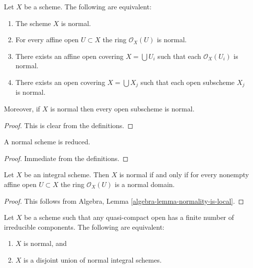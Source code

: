 \begin{lemma}
\label{lemma-locally-normal}
Let $X$ be a scheme. The following are equivalent:
\begin{enumerate}
\item The scheme $X$ is normal.
\item For every affine open $U \subset X$ the ring $\mathcal{O}_X(U)$
is normal.
\item There exists an affine open covering $X = \bigcup U_i$ such that
each $\mathcal{O}_X(U_i)$ is normal.
\item There exists an open covering $X = \bigcup X_j$
such that each open subscheme $X_j$ is normal.
\end{enumerate}
Moreover, if $X$ is normal then every open subscheme
is normal.
\end{lemma}

\begin{proof}
This is clear from the definitions.
\end{proof}

\begin{lemma}
\label{lemma-normal-reduced}
A normal scheme is reduced.
\end{lemma}

\begin{proof}
Immediate from the definitions.
\end{proof}

\begin{lemma}
\label{lemma-integral-normal}
Let $X$ be an integral scheme.
Then $X$ is normal if and only if for every nonempty affine open
$U \subset X$ the ring $\mathcal{O}_X(U)$ is a normal domain.
\end{lemma}

\begin{proof}
This follows from
Algebra, Lemma \ref{algebra-lemma-normality-is-local}.
\end{proof}

\begin{lemma}
\label{lemma-normal-locally-finite-nr-irreducibles}
Let $X$ be a scheme such that any quasi-compact open has a finite number
of irreducible components. The following are equivalent:
\begin{enumerate}
\item $X$ is normal, and
\item $X$ is a disjoint union of normal integral schemes.
\end{enumerate}
\end{lemma}

